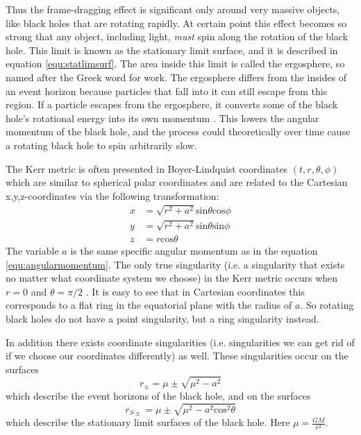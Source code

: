 \documentclass[english, oneside]{HYgradu}
\begin{document}
Thus the frame-dragging effect is significant only around very massive objects, like black holes that are rotating rapidly. At certain point this effect becomes so strong that any object, including light, \textit{must} spin along the rotation of the black hole. This limit is known as the stationary limit surface, and it is described in equation \eqref{equ:statlimsurf}. The area inside this limit is called the ergosphere, so named after the Greek word for work. The ergosphere differs from the insides of an event horizon because particles that fall into it can still escape from this region. If a particle escapes from the ergosphere, it converts some of the black hole's rotational energy into its own momentum \citep{grintro}. This lowers the angular momentum of the black hole, and the process could theoretically over time cause a rotating black hole to spin arbitrarily slow.


The Kerr metric is often presented in Boyer-Lindquist coordinates $(t, r, \theta, \phi)$ which are similar to spherical polar coordinates and are related to the Cartesian x,y,z-coordinates via the following transformation:
\begin{align*}
x &= \sqrt{r^2 + a^2} \mathrm{sin}\theta \mathrm{cos}\phi \\
y &= \sqrt{r^2 + a^2} \mathrm{sin}\theta \mathrm{sin}\phi \\
z &= r \mathrm{cos}\theta
\end{align*}
The variable $a$ is the same specific angular momentum as in the equation \eqref{equ:angularmomentum}. The only true singularity (i.e. a singularity that exists no matter what coordinate system we choose) in the Kerr metric occurs when $r=0$ and $\theta = \pi/2$ \citep{grintro}. It is easy to see that in Cartesian coordinates this corresponds to a flat ring in the equatorial plane with the radius of $a$. So rotating black holes do not have a point singularity, but a ring singularity instead.

In addition there exists coordinate singularities (i.e. singularities we can get rid of if we choose our coordinates differently) as well. These singularities occur on the surfaces
\begin{equation} \label{equ:evenhorizons}
r_\pm = \mu \pm \sqrt{\mu^2 - a^2}
\end{equation}
which describe the event horizons of the black hole, and on the surfaces
\begin{equation} \label{equ:statlimsurf}
r_{S \pm} = \mu \pm \sqrt{\mu^2 - a^2 \mathrm{cos}^2 \theta}
\end{equation}
which describe the stationary limit surfaces of the black hole. Here $\mu = \frac{GM}{c^2}$. 
\end{document}
